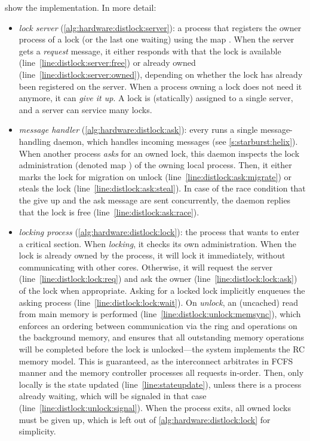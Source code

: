  show the implementation.
In more detail:
%
\begin{itemize}
\item \emph{lock server} (\cref{alg:hardware:distlock:server}): a process that registers the owner process of a lock (or the last one waiting) using the map \SYMservermap.
	When the server gets a \emph{request} message, it either responds with that the lock is available (line~\ref{line:distlock:server:free}) or already owned (line~\ref{line:distlock:server:owned}), depending on whether the lock has already been registered on the server.
	When a process owning a lock does not need it anymore, it can \emph{give it up}.
	A lock is (statically) assigned to a single server, and a server can service many locks.
\item \emph{message handler} (\cref{alg:hardware:distlock:ask}): every \MicroBlaze runs a single message-handling daemon, which handles incoming messages (see \cref{s:starburst:helix}).
	When another process \emph{asks} for an owned lock, this daemon inspects the lock administration (denoted map \SYMlockset[\SYMproc]) of the owning local process.
	Then, it either marks the lock for migration on unlock (line~\ref{line:distlock:ask:migrate}) or steals the lock (line~\ref{line:distlock:ask:steal}).
	In case of the race condition that the give up and the ask message are sent concurrently, the daemon replies that the lock is free (line~\ref{line:distlock:ask:race}).
\item \emph{locking process} (\cref{alg:hardware:distlock:lock}): the process that wants to enter a critical section.
	When \emph{locking}, it checks its own administration.
	When the lock is already owned by the process, it will lock it immediately, without communicating with other cores.
	Otherwise, it will request the server (line~\ref{line:distlock:lock:req}) and ask the owner (line~\ref{line:distlock:lock:ask}) of the lock when appropriate.
	Asking for a locked lock implicitly enqueues the asking process (line~\ref{line:distlock:lock:wait}).
	On \emph{unlock}, an (uncached) read from main memory is performed (line~\ref{line:distlock:unlock:memsync}), which enforces an ordering between communication via the ring and operations on the background memory, and ensures that all outstanding memory operations will be completed before the lock is unlocked---the system implements the \acl{RC} memory model.
	This is guaranteed, as the interconnect arbitrates in \ac{FCFS} manner and the memory controller processes all requests in-order.
	Then, only locally is the state updated (line~\ref{line:stateupdate}), unless there is a process already waiting, which will be signaled in that case (line~\ref{line:distlock:unlock:signal}). 
	When the process exits, all owned locks must be given up, which is left out of \cref{alg:hardware:distlock:lock} for simplicity.
\end{itemize}

